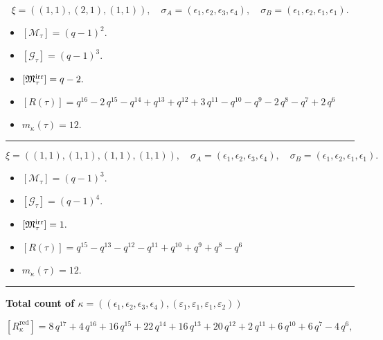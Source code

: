 \documentclass[10pt,a4paper]{amsart}
\begin{document}
$$\xi = ({(1, 1)}, {(2, 1)}, {(1, 1)}),\quad \sigma_A = ({{\epsilon_1}}, {{\epsilon_2, \epsilon_3}}, {{\epsilon_4}}),\quad \sigma_B = ({{\epsilon_1}}, {{\epsilon_2, \epsilon_1}}, {{\epsilon_1}}).$$

\begin{itemize}
 \item $[\mathcal{M}_{\tau}] = {\left(q - 1\right)}^{2} .$

 \item $[\mathcal{G}_{\tau}] = {\left(q - 1\right)}^{3} .$

 \item $[{\frak M}_{\tau}^{\textrm{irr}}] = q - 2 .$

 \item $[R(\tau)] = q^{16} - 2 \, q^{15} - q^{14} + q^{13} + q^{12} + 3 \, q^{11} - q^{10} - q^{9} - 2 \, q^{8} - q^{7} + 2 \, q^{6} $

 \item $m_{\kappa}(\tau) = 12 .$

 \end{itemize}
\noindent\rule{8cm}{0.4pt}

$$\xi = ({(1, 1)}, {(1, 1)}, {(1, 1), (1, 1)}),\quad \sigma_A = ({{\epsilon_1}}, {{\epsilon_2}}, {{\epsilon_3}, {\epsilon_4}}),\quad \sigma_B = ({{\epsilon_1}}, {{\epsilon_2}}, {{\epsilon_1}, {\epsilon_1}}).$$

\begin{itemize}
 \item $[\mathcal{M}_{\tau}] = {\left(q - 1\right)}^{3} .$

 \item $[\mathcal{G}_{\tau}] = {\left(q - 1\right)}^{4} .$

 \item $[{\frak M}_{\tau}^{\textrm{irr}}] = 1 .$

 \item $[R(\tau)] = q^{15} - q^{13} - q^{12} - q^{11} + q^{10} + q^{9} + q^{8} - q^{6} $

 \item $m_{\kappa}(\tau) = 12 .$

 \end{itemize}
\noindent\rule{9cm}{2pt}\vspace{0.2cm}

\noindent\textbf{Total count of $\kappa = ((\epsilon_1,\epsilon_2,\epsilon_3,\epsilon_4), (\varepsilon_1,\varepsilon_1,\varepsilon_1,\varepsilon_2))$}\medskip

${[R_{\kappa}^{\textrm{red}}]} = 8 \, q^{17} + 4 \, q^{16} + 16 \, q^{15} + 22 \, q^{14} + 16 \, q^{13} + 20 \, q^{12} + 2 \, q^{11} + 6 \, q^{10} + 6 \, q^{7} - 4 \, q^{6} ,$
\end{document}

